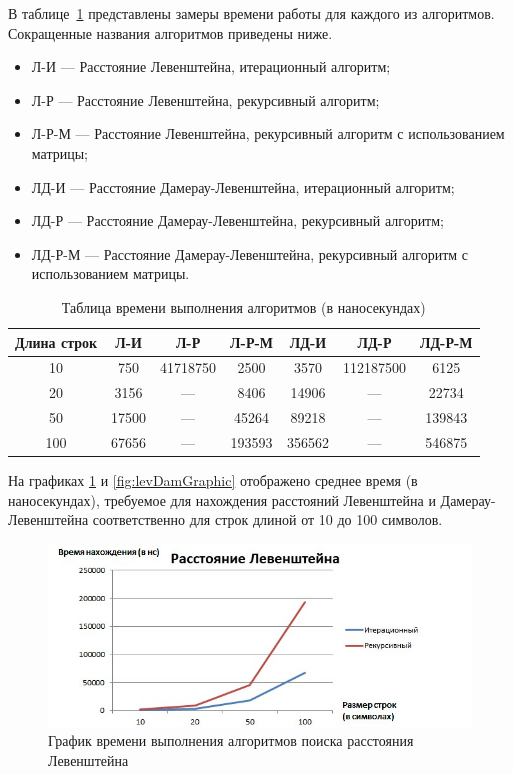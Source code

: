 \documentclass[12pt]{report}
\begin{document}
    В таблице~\ref{tab:times} представлены замеры времени работы для каждого из алгоритмов.
    Сокращенные названия алгоритмов приведены ниже.
    \begin{itemize}
        \item Л-И --- Расстояние Левенштейна, итерационный алгоритм;
        \item Л-Р --- Расстояние Левенштейна, рекурсивный алгоритм;
        \item Л-Р-М --- Расстояние Левенштейна, рекурсивный алгоритм с использованием матрицы;
        \item ЛД-И --- Расстояние Дамерау-Левенштейна, итерационный алгоритм;
        \item ЛД-Р --- Расстояние Дамерау-Левенштейна, рекурсивный алгоритм;
        \item ЛД-Р-М --- Расстояние Дамерау-Левенштейна, рекурсивный алгоритм с использованием матрицы.
    \end{itemize}

    \begin{table}[H]
        \caption{Таблица времени выполнения алгоритмов (в наносекундах)}
        \label{tab:times}
        \centering
        \begin{tabular}{|c c c c c c c|}
            \hline
            Длина строк & Л-И   & Л-Р      & Л-Р-М  & ЛД-И   & ЛД-Р      & ЛД-Р-М \\
            \hline
            10          & 750   & 41718750 & 2500   & 3570   & 112187500 & 6125   \\
            \hline
            20          & 3156  & ---      & 8406   & 14906  & ---       & 22734  \\
            \hline
            50          & 17500 & ---      & 45264  & 89218  & ---       & 139843 \\
            \hline
            100         & 67656 & ---      & 193593 & 356562 & ---       & 546875 \\
            \hline
        \end{tabular}
    \end{table}

    На графиках \ref{fig:levGraphic} и \ref{fig:levDamGraphic} отображено среднее время (в наносекундах),
    требуемое для нахождения расстояний Левенштейна и Дамерау-Левенштейна соответственно
    для строк длиной от 10 до 100 символов.

    \begin{figure}[H]
        \centering
        \includegraphics[scale=0.75]{img/levGraphic}
        \caption{График времени выполнения алгоритмов поиска расстояния Левенштейна}
        \label{fig:levGraphic}
    \end{figure}
\end{document}
